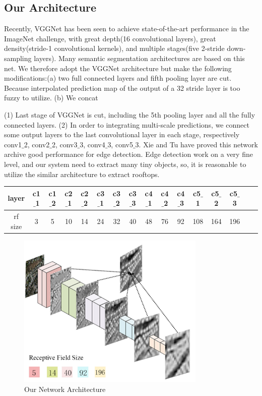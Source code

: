 \documentclass[runningheads]{llncs}
\begin{document}
\subsection{Our Architecture} 
    Recently, VGGNet \cite{Simonyan2014Very} has been seen to achieve state-of-the-art performance in the ImageNet challenge, with great depth(16 convolutional layers), great density(stride-1 convolutional kernels), and multiple stages(five 2-stride down-sampling layers). Many semantic segmentation architectures \cite{Long2014Fully} \cite{Noh2015Learning}  \cite{chen14semantic} \cite{Zheng2015Conditional} are based on this net. We therefore adopt the VGGNet architecture but make the following modifications:(a) two full connected layers and fifth pooling layer are cut. Because interpolated prediction map of the output of a 32 stride layer is too fuzzy to utilize. (b) We concat 
    
    
   (1) Last stage of VGGNet is cut, including the 5th pooling layer and all the fully connected layers.  (2) In order to integrating multi-scale predictions, we connect some output layers to the last convolutional layer in each stage, respectively conv1$\_$2, conv2$\_$2, conv3$\_$3, conv4$\_$3, conv5$\_$3. Xie and Tu \cite{Xie2015Holistically} have proved this network archive good performance for edge detection. Edge detection work on a very fine level, and our system need to extract many tiny objects, so, it is reasonable to utilize the similar architecture to extract rooftops.
   
 	\begin{tabular}{c|ccccccccccccccc}
	\hline
	layer & c1$\_$1 & c1$\_$2  & c2$\_$1  & c2$\_$2  & c3$\_$1  & c3$\_$2  & c3$\_$3  & c4$\_$1  & c4$\_$2  & c4$\_$3  & c5$\_$1  & c5$\_$2  & c5$\_$3\\
	\hline
    rf size & 3 & 5   & 10  & 14  & 24  & 32  & 40  & 48  & 76  & 92  & 108  & 164  & 196 \\
	\hline
    \end{tabular}
 	
 	
\begin{figure}
\centering
\includegraphics[width=90mm]{ourArchitecture}
\caption{Our Network Architecture}
\label{fig:ourArchitecture}
\end{figure}
\end{document}
